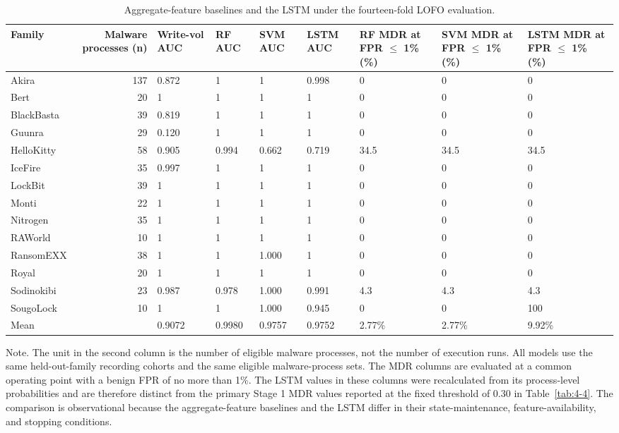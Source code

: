 \begin{table}[htbp]
\centering
\caption{Aggregate-feature baselines and the \textmu{}LSTM under the fourteen-fold LOFO evaluation.}\label{tab:4-13}
\begin{adjustbox}{max width=\textwidth}
\footnotesize
\begin{tabular}{lrlllllll}
\hline
\textbf{Family} & \textbf{Malware processes (n)} & \textbf{Write-vol AUC} & \textbf{RF AUC} & \textbf{SVM AUC} & \textbf{\textmu{}LSTM AUC} & \textbf{RF MDR at FPR $\le$ 1\% (\%)} & \textbf{SVM MDR at FPR $\le$ 1\% (\%)} & \textbf{\textmu{}LSTM MDR at FPR $\le$ 1\% (\%)} \\
\hline
Akira & 137 & 0.872 & 1 & 1 & 0.998 & 0 & 0 & 0 \\
Bert & 20 & 1 & 1 & 1 & 1 & 0 & 0 & 0 \\
BlackBasta & 39 & 0.819 & 1 & 1 & 1 & 0 & 0 & 0 \\
Guunra & 29 & 0.120 & 1 & 1 & 1 & 0 & 0 & 0 \\
HelloKitty & 58 & 0.905 & 0.994 & 0.662 & 0.719 & 34.5 & 34.5 & 34.5 \\
IceFire & 35 & 0.997 & 1 & 1 & 1 & 0 & 0 & 0 \\
LockBit & 39 & 1 & 1 & 1 & 1 & 0 & 0 & 0 \\
Monti & 22 & 1 & 1 & 1 & 1 & 0 & 0 & 0 \\
Nitrogen & 35 & 1 & 1 & 1 & 1 & 0 & 0 & 0 \\
RAWorld & 10 & 1 & 1 & 1 & 1 & 0 & 0 & 0 \\
RansomEXX & 38 & 1 & 1 & 1.000 & 1 & 0 & 0 & 0 \\
Royal & 20 & 1 & 1 & 1 & 1 & 0 & 0 & 0 \\
Sodinokibi & 23 & 0.987 & 0.978 & 1.000 & 0.991 & 4.3 & 4.3 & 4.3 \\
SougoLock & 10 & 1 & 1 & 1.000 & 0.945 & 0 & 0 & 100 \\
Mean &  & 0.9072 & 0.9980 & 0.9757 & 0.9752 & 2.77\% & 2.77\% & 9.92\% \\
\hline
\end{tabular}
\end{adjustbox}
\end{table}

Note. The unit in the second column is the number of eligible malware processes, not the number of execution runs. All models use the same held-out-family recording cohorts and the same eligible malware-process sets. The MDR columns are evaluated at a common operating point with a benign FPR of no more than 1\%. The \textmu{}LSTM values in these columns were recalculated from its process-level probabilities and are therefore distinct from the primary Stage 1 MDR values reported at the fixed threshold of 0.30 in Table~\ref{tab:4-4}. The comparison is observational because the aggregate-feature baselines and the \textmu{}LSTM differ in their state-maintenance, feature-availability, and stopping conditions.

